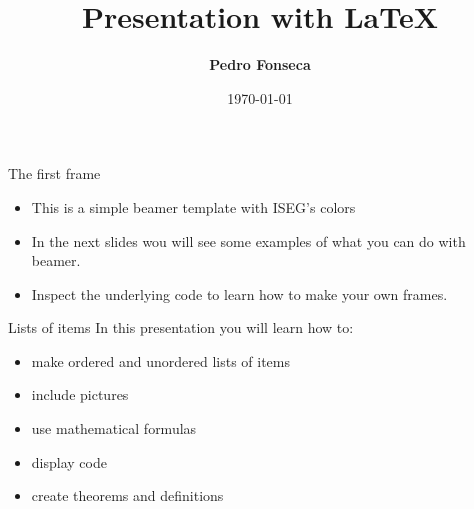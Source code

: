 


\title[Presentation with LaTeX]{Presentation with \LaTeX}

\author[Pedro Fonseca]{\textbf {Pedro Fonseca}}

\date{\today}







\begin{frame}{The first frame}
	\begin{itemize}
		\item This is a simple beamer template with ISEG's colors
		\item In the next slides wou will see some examples of what you can do with beamer.
		\item Inspect the underlying code to learn how to make your own frames.
	\end{itemize}
\end{frame}


\begin{frame}{Lists of items}
	In this presentation you will learn how to:
	\begin{itemize}
	\item make ordered and unordered lists of items
	\item include pictures
	\item use mathematical formulas
	\item display code
	\item create theorems and definitions
	\end{itemize}
\end{frame}


